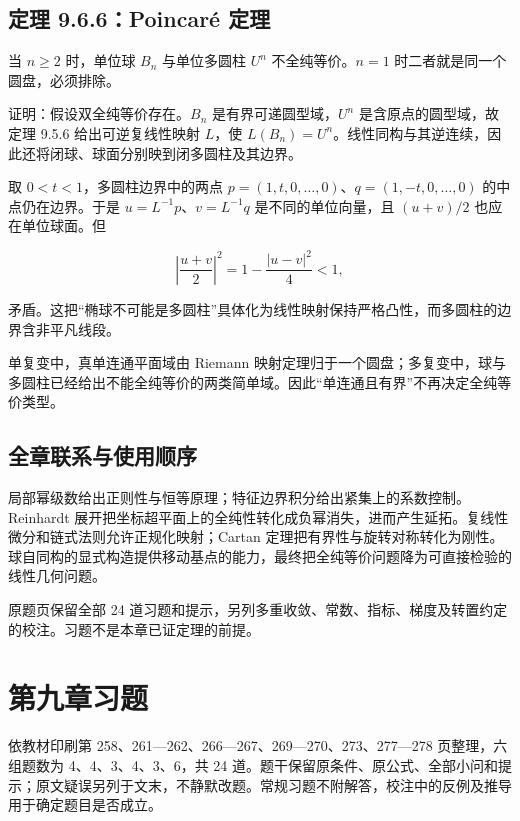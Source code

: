 \documentclass[11pt,a4paper]{article}
\begin{document}
\subsection{定理 9.6.6：Poincaré 定理}\label{ch09-s6-heading-8}

当 \(n\ge2\) 时，单位球 \(B_n\) 与单位多圆柱 \(U^n\) 不全纯等价。\(n=1\)
时二者就是同一个圆盘，必须排除。

证明：假设双全纯等价存在。\(B_n\) 是有界可递圆型域，\(U^n\)
是含原点的圆型域，故定理 9.5.6 给出可逆复线性映射 \(L\)，使
\(L(B_n)=U^n\)。线性同构与其逆连续，因此还将闭球、球面分别映到闭多圆柱及其边界。

取 \(0<t<1\)，多圆柱边界中的两点
\(p=(1,t,0,\ldots,0)\)、\(q=(1,-t,0,\ldots,0)\) 的中点仍在边界。于是
\(u=L^{-1}p\)、\(v=L^{-1}q\) 是不同的单位向量，且 \((u+v)/2\)
也应在单位球面。但

\[
\left|\frac{u+v}{2}\right|^2
=1-\frac{|u-v|^2}{4}<1,
\]

矛盾。这把``椭球不可能是多圆柱''具体化为线性映射保持严格凸性，而多圆柱的边界含非平凡线段。

单复变中，真单连通平面域由 Riemann
映射定理归于一个圆盘；多复变中，球与多圆柱已经给出不能全纯等价的两类简单域。因此``单连通且有界''不再决定全纯等价类型。

\subsection*{全章联系与使用顺序}\label{ch09-s6-heading-9}

局部幂级数给出正则性与恒等原理；特征边界积分给出紧集上的系数控制。Reinhardt
展开把坐标超平面上的全纯性转化成负幂消失，进而产生延拓。复线性微分和链式法则允许正规化映射；Cartan
定理把有界性与旋转对称转化为刚性。球自同构的显式构造提供移动基点的能力，最终把全纯等价问题降为可直接检验的线性几何问题。

原题页保留全部 24
道习题和提示，另列多重收敛、常数、指标、梯度及转置约定的校注。习题不是本章已证定理的前提。

\clearpage\section*{第九章习题}
\hypertarget{chapter9-part-7}{}
\par
依教材印刷第 258、261---262、266---267、269---270、273、277---278
页整理，六组题数为 4、4、3、4、3、6，共 24
道。题干保留原条件、原公式、全部小问和提示；原文疑误另列于文末，不静默改题。常规习题不附解答，校注中的反例及推导用于确定题目是否成立。
\end{document}
